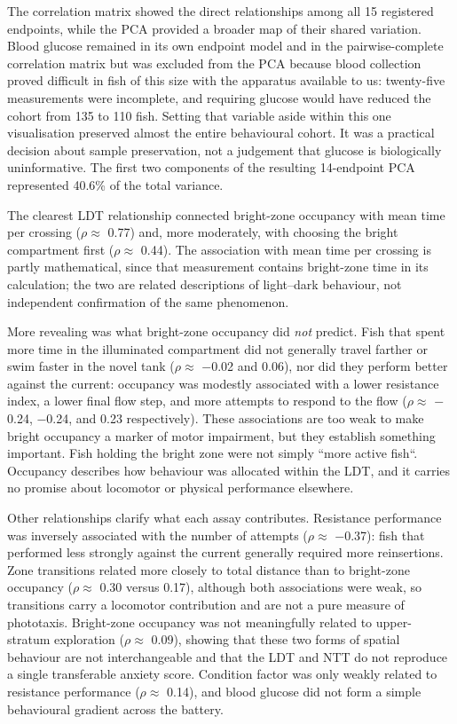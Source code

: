 \documentclass[12pt,a4paper]{article}
\begin{document}
The correlation matrix showed the direct relationships among all 15 registered endpoints, while the PCA provided a broader map of their shared variation. Blood glucose remained in its own endpoint model and in the pairwise-complete correlation matrix but was excluded from the PCA because blood collection proved difficult in fish of this size with the apparatus available to us: twenty-five measurements were incomplete, and requiring glucose would have reduced the cohort from 135 to 110 fish. Setting that variable aside within this one visualisation preserved almost the entire behavioural cohort. It was a practical decision about sample preservation, not a judgement that glucose is biologically uninformative. The first two components of the resulting 14-endpoint PCA represented 40.6\% of the total variance.

The clearest LDT relationship connected bright-zone occupancy with mean time per crossing ($\rho \approx$ 0.77) and, more moderately, with choosing the bright compartment first ($\rho \approx$ 0.44). The association with mean time per crossing is partly mathematical, since that measurement contains bright-zone time in its calculation; the two are related descriptions of light--dark behaviour, not independent confirmation of the same phenomenon.

More revealing was what bright-zone occupancy did \emph{not} predict. Fish that spent more time in the illuminated compartment did not generally travel farther or swim faster in the novel tank ($\rho \approx$ $-$0.02 and 0.06), nor did they perform better against the current: occupancy was modestly associated with a lower resistance index, a lower final flow step, and more attempts to respond to the flow ($\rho \approx$ $-$0.24, $-$0.24, and 0.23 respectively). These associations are too weak to make bright occupancy a marker of motor impairment, but they establish something important. Fish holding the bright zone were not simply ``more active fish``. Occupancy describes how behaviour was allocated within the LDT, and it carries no promise about locomotor or physical performance elsewhere.

Other relationships clarify what each assay contributes. Resistance performance was inversely associated with the number of attempts ($\rho \approx$ $-$0.37): fish that performed less strongly against the current generally required more reinsertions. Zone transitions related more closely to total distance than to bright-zone occupancy ($\rho \approx$ 0.30 versus 0.17), although both associations were weak, so transitions carry a locomotor contribution and are not a pure measure of phototaxis. Bright-zone occupancy was not meaningfully related to upper-stratum exploration ($\rho \approx$ 0.09), showing that these two forms of spatial behaviour are not interchangeable and that the LDT and NTT do not reproduce a single transferable anxiety score. Condition factor was only weakly related to resistance performance ($\rho \approx$ 0.14), and blood glucose did not form a simple behavioural gradient across the battery.
\end{document}
